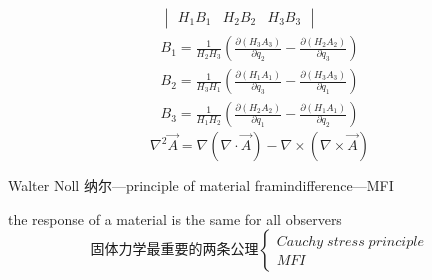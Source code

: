\documentclass[12pt, a4paper, oneside, UTF8]{ctexbook}  %
\begin{document}
\begin{add}
\begin{gather*}
\begin{vmatrix}
            H_1 B_1 & H_2 B_2 & H_3 B_3
            \end{vmatrix}\\
            B_1=\frac{1}{H_2 H_3} \left( \frac{\partial (H_3 A_3)}{\partial q_2} - \frac{\partial (H_2 A_2)}{\partial q_3} \right)\\
            B_2=\frac{1}{H_3 H_1} \left( \frac{\partial (H_1 A_1)}{\partial q_3} - \frac{\partial (H_3 A_3)}{\partial q_1} \right)\\
            B_3=\frac{1}{H_1 H_2} \left( \frac{\partial (H_2 A_2)}{\partial q_1} - \frac{\partial (H_1 A_1)}{\partial q_2} \right)
        \end{gather*}
        \[
            \nabla^2\vec{A}=\nabla(\nabla\cdot\vec{A})-\nabla\times(\nabla\times\vec{A})
        \]
\end{add}
\begin{defn}
    Walter Noll 纳尔---principle of material fram\textminus indifference---MFI

    the response of a material is the same for all observers
\[\text{固体力学最重要的两条公理}\begin{cases}
    Cauchy\; stress\; principle\\
    MFI
\end{cases}\]
\end{defn}
\end{document}
